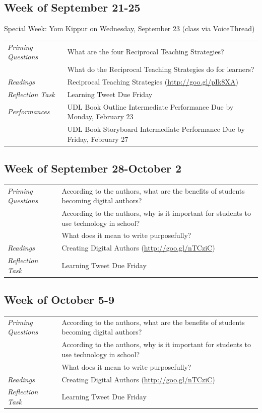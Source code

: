\documentclass{tufte-handout}
\newcommand{\tabpq}{\faQuestionCircle\medspace\textit{Priming Questions}}
\newcommand{\tabread}{\faBook\medspace\textit{Readings}}
\newcommand{\tabperformance}{\faTasks\medspace\textit{Performances}}
\newcommand{\tabtweet}{\faLightbulbO\medspace\textit{Reflection Task} & Learning Tweet Due Friday \\}
\newenvironment{tabsched}
	{\small
	\begin{tabular}{p{1.5in}p{4.5in}}
	\toprule}
	{\bottomrule
	\end{tabular}
	\normalsize}
\newenvironment{specweek}
	{\begin{center}
		\fontseries{b} \faBullhorn \medspace Special Week: }
		{\medspace \faBullhorn \fontseries{m}
	\end{center}}
\newcommand{\weeksix}{September 21-25}
\newcommand{\weekseven}{September 28-October 2}
\newcommand{\weekeight}{October 5-9}
\newcommand{\yomkippur}{Yom Kippur on Wednesday, September 23 (class via VoiceThread)}
\begin{document}
\subsection{Week of \weeksix}

\begin{specweek}\yomkippur\end{specweek}

\begin{tabsched}
	\tabpq & What are the four Reciprocal Teaching Strategies? \\
	& What do the Reciprocal Teaching Strategies do for learners? \\
	\midrule
	\tabread & Reciprocal Teaching Strategies (\url{http://goo.gl/pIk8XA}) \\
	\midrule
	\tabtweet
	\midrule
	\tabperformance & UDL Book Outline Intermediate Performance Due by Monday, February 23 \\
	& UDL Book Storyboard Intermediate Performance Due by Friday, February 27 \\

\end{tabsched}

\subsection{Week of \weekseven}

\begin{tabsched}
	\tabpq & According to the authors, what are the benefits of students becoming digital authors? \\
	& According to the authors, why is it important for students to use technology in school? \\
	& What does it mean to write purposefully? \\
	\midrule
	\tabread & Creating Digital Authors (\url{http://goo.gl/nTCziC}) \\
	\midrule
	\tabtweet
\end{tabsched}

\subsection{Week of \weekeight}

\begin{tabsched}
	\tabpq & According to the authors, what are the benefits of students becoming digital authors? \\
	& According to the authors, why is it important for students to use technology in school? \\
	& What does it mean to write purposefully? \\
	\midrule
	\tabread & Creating Digital Authors (\url{http://goo.gl/nTCziC}) \\
	\midrule
	\tabtweet
\end{tabsched}
\end{document}
